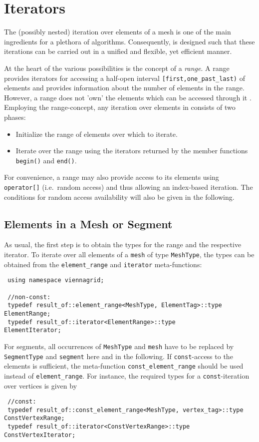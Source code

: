 \chapter{Iterators} \label{chap:iterators}

The (possibly nested) iteration over elements of a mesh is one of the main ingredients for a plethora of algorithms.
Consequently, {\ViennaGrid} is designed such that these iterations can be carried out in a unified and flexible, yet efficient manner.

At the heart of the various possibilities is the concept of a \emph{range}. A range provides iterators for accessing a half-open interval \texttt{[first,one\_past\_last)} of elements and provides information about the number of elements in the range. However, a range does not 'own' the elements which can be accessed through it \cite{boost}.
Employing the range-concept, any iteration over elements in {\ViennaGrid} consists of two phases:
\begin{itemize}
 \item Initialize the range of elements over which to iterate.
 \item Iterate over the range using the iterators returned by the member functions \lstinline|begin()| and \lstinline|end()|.
\end{itemize}

For convenience, a range may also provide access to its elements using \lstinline|operator[]| (i.e.~random access) and thus allowing an index-based iteration. The conditions for random access availability will also be given in the following.


\section{Elements in a Mesh or Segment}
As usual, the first step is to obtain the types for the range and the respective iterator.
To iterate over all elements of a \lstinline|mesh| of type \lstinline|MeshType|, the types can be obtained from the \lstinline|element_range| and \lstinline|iterator| meta-functions:
\begin{lstlisting}
 using namespace viennagrid;

 //non-const:
 typedef result_of::element_range<MeshType, ElementTag>::type ElementRange;
 typedef result_of::iterator<ElementRange>::type           ElementIterator;
\end{lstlisting}
For segments, all occurrences of \lstinline|MeshType| and \lstinline|mesh| have to be replaced by \lstinline|SegmentType| and \lstinline|segment| here and in the following.
If \lstinline|const|-access to the elements is sufficient, the meta-function \lstinline|const_element_range| should be used instead of \lstinline|element_range|.
For instance, the required types for a \lstinline|const|-iteration over vertices is given by
\begin{lstlisting}
 //const:
 typedef result_of::const_element_range<MeshType, vertex_tag>::type   ConstVertexRange;
 typedef result_of::iterator<ConstVertexRange>::type         ConstVertexIterator;
\end{lstlisting}

